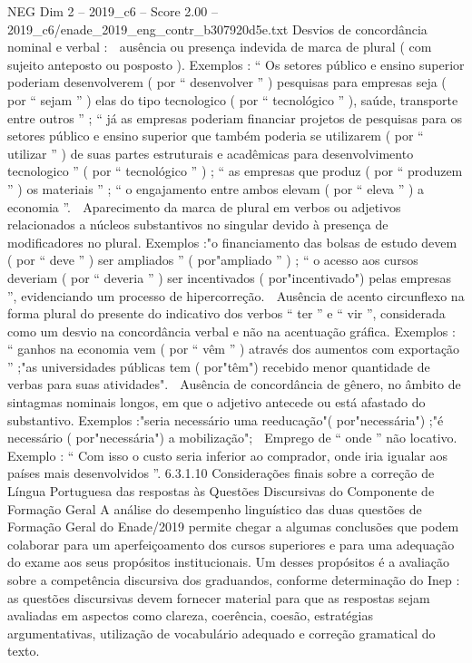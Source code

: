 \begin{textsample}{NEG Dim 2 – 2019\_c6 – Score 2.00 – 2019\_c6/enade\_2019\_eng\_contr\_b307920d5e.txt}
Desvios de concordância nominal e verbal :  ausência ou presença indevida de marca de plural ( com sujeito anteposto ou posposto ).
Exemplos : “ Os setores público e ensino superior poderiam desenvolverem ( por “ desenvolver ” ) pesquisas para empresas seja ( por “ sejam ” ) elas do tipo tecnologico ( por “ tecnológico ” ), saúde, transporte entre outros ” ; “ já as empresas poderiam financiar projetos de pesquisas para os setores público e ensino superior que também poderia se utilizarem ( por “ utilizar ” ) de suas partes estruturais e acadêmicas para desenvolvimento tecnologico ” ( por “ tecnológico ” ) ; “ as empresas que produz ( por “ produzem ” ) os materiais ” ; “ o engajamento entre ambos elevam ( por “ eleva ” ) a economia ”.  Aparecimento da marca de plural em verbos ou adjetivos relacionados a núcleos substantivos no singular devido à presença de modificadores no plural.
Exemplos :"o financiamento das bolsas de estudo devem ( por “ deve ” ) ser ampliados ” ( por"ampliado ” ) ; “ o acesso aos cursos deveriam ( por “ deveria ” ) ser incentivados ( por"incentivado") pelas empresas ”, evidenciando um processo de hipercorreção.  Ausência de acento circunflexo na forma plural do presente do indicativo dos verbos “ ter ” e “ vir ”, considerada como um desvio na concordância verbal e não na acentuação gráfica.
Exemplos : “ ganhos na economia vem ( por “ vêm ” ) através dos aumentos com exportação ” ;"as universidades públicas tem ( por"têm") recebido menor quantidade de verbas para suas atividades".  Ausência de concordância de gênero, no âmbito de sintagmas nominais longos, em que o adjetivo antecede ou está afastado do substantivo.
Exemplos :"seria necessário uma reeducação"( por"necessária") ;"é necessário ( por"necessária") a mobilização";  Emprego de “ onde ” não locativo.
Exemplo : “ Com isso o custo seria inferior ao comprador, onde iria igualar aos países mais desenvolvidos ”. 6.3.1.10 Considerações finais sobre a correção de Língua Portuguesa das respostas às Questões Discursivas do Componente de Formação Geral A análise do desempenho linguístico das duas questões de Formação Geral do Enade/2019 permite chegar a algumas conclusões que podem colaborar para um aperfeiçoamento dos cursos superiores e para uma adequação do exame aos seus propósitos institucionais.
Um desses propósitos é a avaliação sobre a competência discursiva dos graduandos, conforme determinação do Inep : as questões discursivas devem fornecer material para que as respostas sejam avaliadas em aspectos como clareza, coerência, coesão, estratégias argumentativas, utilização de vocabulário adequado e correção gramatical do texto.

\end{textsample}

